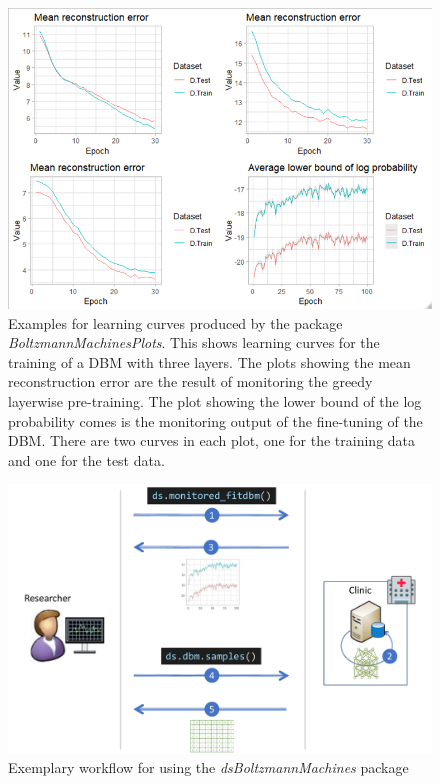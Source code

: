 \documentclass[12pt]{article}
\newcommand{\apkg}[1]{\emph{#1}}
\begin{document}
 
\begin{figure}[h]
   \centering
   \includegraphics[scale=0.4,trim={0.1cm 0 0 0.1cm},clip]{images/dsBoltzmannLearningcurves.png}
   \caption{Examples for learning curves produced by the package \apkg{BoltzmannMachinesPlots}. This shows learning curves for the training of a DBM with three layers. The plots showing the mean reconstruction error are the result of monitoring the greedy layerwise pre-training. The plot showing the lower bound of the log probability comes is the monitoring output of the fine-tuning of the DBM. There are two curves in each plot, one for the training data and one for the test data.}
 \end{figure}

\begin{figure}[h]
   \centering
   \includegraphics[scale=0.5]{images/dsBoltzmannWorkflow.pdf}
   \caption{Exemplary workflow for using the \apkg{dsBoltzmannMachines} package}
 \end{figure}
 
\end{document}
